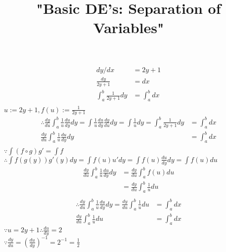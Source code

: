 \documentclass[10pt]{article}
\title{"Basic DE's: Separation of Variables"}
\date{}
\begin{document}
  \maketitle 
  \begin{align}
    dy/dx &= 2y + 1 \\
    \frac{dy}{2y+1} &= dx \\
    \int_a^b \frac{1}{2y+1}dy &= \int_a^b dx \\
  \end{align} 
    $u := 2y+1, f(u) := \frac{1}{2y+1}$
  \begin{align}
    \therefore \frac{dy}{du} \int_a^b \frac{1}{u} \frac{du}{dy} dy = \int \frac{1}{u} \frac{du}{dy} \frac{dy}{du}dy = \int \frac{1}{u}dy = \int_a^b \frac{1}{2y+1}dy &= \int_a^b dx \\
    \frac{dy}{du} \int_a^b \frac{1}{u} \frac{du}{dy} dy &= \int_a^b dx \\
  \end{align} 
$\because \int (f \circ g)g' = \int f$ \\
$\therefore \int f(g(y))g'(y)dy = \int f(u)u'dy = \int f(u) \frac{du}{dy}dy = \int f(u)du$ \\
  \begin{align} 
    \frac{dy}{du} \int_a^b \frac{1}{u} \frac{du}{dy} dy
                      &= \frac{dy}{du} \int_a^b f(u) du \\
                      &= \frac{dy}{du} \int_a^b \frac{1}{u} du \\
  \end{align}
%  
  \begin{align}
    \therefore \frac{dy}{du} \int_a^b \frac{1}{u} \frac{du}{dy} dy = \frac{dy}{du} \int_a^b \frac{1}{u} du &= \int_a^b dx \\
    \frac{dy}{du} \int_a^b \frac{1}{u} du &= \int_a^b dx
  \end{align}
$\because u = 2y+1 \therefore \frac{du}{dy} = 2$ \\
$\because \frac{dy}{du} = (\frac{du}{dy})^{-1} = 2^{-1} = \frac{1}{2}$ \\
\end{document}
